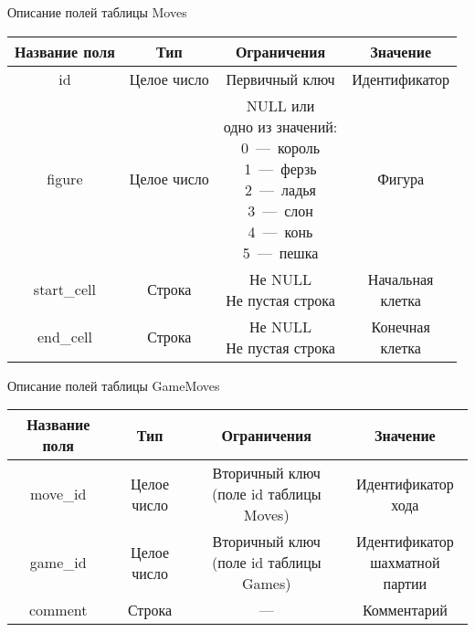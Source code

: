 \begin{center}
	\begin{threeparttable}
		\captionsetup{justification=raggedright,singlelinecheck=off}
		\caption{\label{moves_table}Описание полей таблицы Moves}
		\centering
		\begin{tabular}{|c|c|c|c|}
			\hline
			Название поля & Тип & Ограничения & Значение \\
			\hline
			id & Целое число & Первичный ключ & Идентификатор \\
			\hline
			figure & Целое число & \specialcell{NULL или\\одно из значений:\\0~---~король\\1~---~ферзь\\2~---~ладья\\3~---~слон\\4~---~конь\\5~---~пешка} & Фигура\\
			\hline
			start\_cell & Строка & \specialcell{Не NULL\\Не пустая строка} & \specialcell{Начальная\\клетка} \\
			\hline
			end\_cell & Строка & \specialcell{Не NULL\\Не пустая строка} & \specialcell{Конечная\\клетка} \\
			\hline
		\end{tabular}
	\end{threeparttable}
\end{center}
\begin{center}
	\begin{threeparttable}
		\captionsetup{justification=raggedright,singlelinecheck=off}
		\caption{\label{gamemoves_table}Описание полей таблицы GameMoves}
		\centering
		\begin{tabular}{|c|c|c|c|}
			\hline
			Название поля & Тип & Ограничения & Значение \\
			\hline
			move\_id & Целое число & \specialcell{Вторичный ключ\\(поле id таблицы Moves)} & \specialcell{Идентификатор\\хода} \\
			\hline
			game\_id & Целое число & \specialcell{Вторичный ключ\\(поле id таблицы Games)} & \specialcell{Идентификатор\\шахматной партии} \\
			\hline
			comment & Строка & --- & Комментарий \\
			\hline
		\end{tabular}
	\end{threeparttable}
\end{center}

